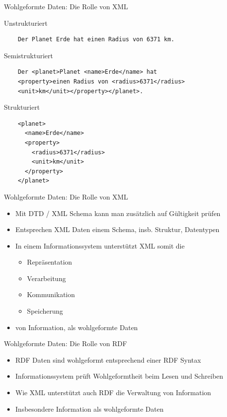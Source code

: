 \documentclass{beamer}
\begin{document}
\begin{frame}[fragile]{Wohlgeformte Daten: Die Rolle von XML}

	Unstrukturiert
	\small\begin{lstlisting}
	Der Planet Erde hat einen Radius von 6371 km.
	\end{lstlisting}\normalsize
	
	Semistrukturiert
	\lstset{language=XML}	
	\small\begin{lstlisting}
	Der <planet>Planet <name>Erde</name> hat 
	<property>einen Radius von <radius>6371</radius> 
	<unit>km</unit></property></planet>.
	\end{lstlisting}\normalsize
	
	Strukturiert
	\lstset{language=XML}	
	\small\begin{lstlisting}	
	<planet>
	  <name>Erde</name>
	  <property>
	    <radius>6371</radius>
	    <unit>km</unit>
	  </property>
	</planet>
	\end{lstlisting}\normalsize
	
\end{frame}

\begin{frame}{Wohlgeformte Daten: Die Rolle von XML}
	
	\begin{itemize}
		\item Mit DTD / XML Schema kann man zusätzlich auf Gültigkeit prüfen
		\item Entsprechen XML Daten einem Schema, insb. Struktur, Datentypen
		\item In einem Informationssystem unterstützt XML somit die
		\begin{itemize}
			\item Repräsentation 
			\item Verarbeitung
			\item Kommunikation
			\item Speicherung
		\end{itemize}
		\item von Information, als wohlgeformte Daten
	\end{itemize}
	
\end{frame}

\begin{frame}{Wohlgeformte Daten: Die Rolle von RDF}
	
	\begin{itemize}
		\item RDF Daten sind wohlgeformt entsprechend einer RDF Syntax
		\item Informationssystem prüft Wohlgeformtheit beim Lesen und Schreiben
		\item Wie XML unterstützt auch RDF die Verwaltung von Information
		\item Insbesondere Information als wohlgeformte Daten
	\end{itemize}
	
\end{frame}
\end{document}
